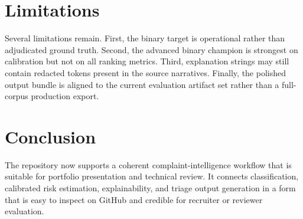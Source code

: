 \documentclass[11pt]{article}
\begin{document}
\section{Limitations}
Several limitations remain. First, the binary target is operational rather than adjudicated ground truth. Second, the advanced binary champion is strongest on calibration but not on all ranking metrics. Third, explanation strings may still contain redacted tokens present in the source narratives. Finally, the polished output bundle is aligned to the current evaluation artifact set rather than a full-corpus production export.

\section{Conclusion}
The repository now supports a coherent complaint-intelligence workflow that is suitable for portfolio presentation and technical review. It connects classification, calibrated risk estimation, explainability, and triage output generation in a form that is easy to inspect on GitHub and credible for recruiter or reviewer evaluation.
\end{document}
